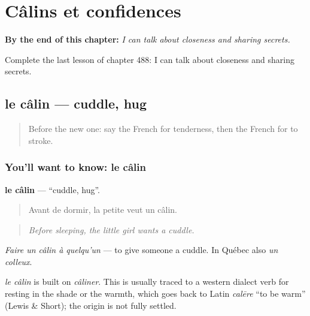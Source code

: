 
\chapter{Câlins et confidences}
\label{ch:fr-calins-et-confidences}

\begin{chapteropening}
\textbf{By the end of this chapter:} \emph{I can talk about closeness and sharing secrets.}

Complete the last lesson of chapter 488: I can talk about closeness and sharing secrets.
\end{chapteropening}

\section[le câlin]{le câlin — cuddle, hug}

\label{lesson:FR-C488-calin}



\begin{quote}
Before the new one: say the French for tenderness, then the French for to stroke.
\end{quote}

\subsection*{You'll want to know: le câlin}
\textbf{le câlin} — \textquotedblleft{}cuddle, hug\textquotedblright{}.

\begin{quote}
Avant de dormir, la petite veut un câlin.
\end{quote}

\begin{quote}
\emph{Before sleeping, the little girl wants a cuddle.}
\end{quote}

\emph{Faire un câlin à quelqu'un} — to give someone a cuddle. In Québec also \emph{un colleux}.

\begin{cousinweb}
\emph{le câlin} is built on \emph{câliner}. This is usually traced to a western dialect verb for resting in the shade or the warmth, which goes back to Latin \emph{calēre} \textquotedblleft{}to be warm\textquotedblright{} (Lewis \& Short); the origin is not fully settled.
\end{cousinweb}

